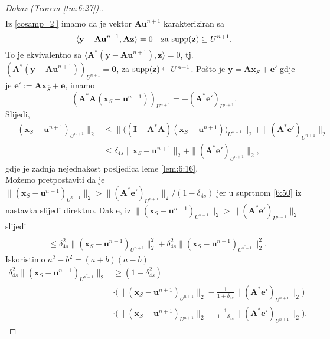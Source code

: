 \documentclass[a4paper,twoside,12pt]{memoir} %
\newcommand{\vect}[1]{\mathbf{#1}}
\renewcommand{\vec}{\vect}
\newcommand{\supp}{\text{\normalfont{supp}}}
\newcommand{\norm}[1]{\|{#1}\|}
\begin{document}
\begin{proof}[Dokaz (Teorem \ref{tm:6:27}).]
\begin{align}
    \end{align}
    Iz \eqref{cosamp_2'} imamo da je vektor $\vec {Au}^{n+1}$ karakteriziran sa
    \begin{equation*}
        \langle \vec y - \vec {Au}^{n+1}, \vec{Az}\rangle  = 0 \quad \text{za } \supp(\vec z) \subseteq U^{n+1}.
    \end{equation*}
    To je ekvivalentno sa $ \langle \vec A^*(\vec y - \vec{Au}^{n+1}), \vec z \rangle = 0$, tj. $(\vec A^*(\vec y - \vec{Au}^{n+1}))_{U^{n+1}} = \vec 0$, za $\supp(\vec z) \subseteq U^{n+1}$. Po\v{s}to je $\vec y = \vec{Ax}_S + \vec e'$ gdje je $\vec e' := \vec{Ax}_{\bar S} + \vec e$, imamo
    \begin{equation*}
        (\vec A^* \vec A(\vec x_S - \vec u^{n+1}))_{U^{n+1}} = - (\vec A^* \vec e')_{U^{n+1}}.
    \end{equation*}
    Slijedi,
    \begin{align*}
        \norm{(\vec x_S - \vec u^{n+1})_{U^{n+1}}}_2 &\leq \norm{\big( (\vec I - \vec A^* \vec A)(\vec x_S - \vec u^{n+1}) \big)_{U^{n+1}}}_2 + \norm{(\vec A^* \vec e')_{U^{n+1}}}_2 \\[0.5em]
        & \leq \delta_{4s}\norm{\vec x_S - \vec u^{n+1}}_2 + \norm{(\vec A^*\vec e')_{U^{n+1}}}_2,
    \end{align*}
    gdje je zadnja nejednakost posljedica leme \ref{lem:6:16}. \\
    Mo\v{z}emo pretpostaviti da je $\norm{(\vec x_S - \vec u^{n+1})_{U^{n+1}}}_2 > \norm{(\vec A^* \vec e')_{U^{n+1}}}_2/(1-\delta_{4s})$ jer u suprtnom \eqref{6:50} iz nastavka slijedi direktno. Dakle, iz $\norm{(\vec x_S - \vec u^{n+1})_{U^{n+1}}}_2 > \norm{(\vec A^* \vec e')_{U^{n+1}}}_2$ slijedi
    \begin{align*}
        [\norm{(\vec x_S - \vec u^{n+1}_{U^{n+1}})}_2 &- \norm{(\vec A^* \vec e')_{U^{n+1}}}_2] \\[0.5em]
        & \leq \delta_{4s}^2 \norm{(\vec x_S - \vec u^{n+1})_{U^{n+1}}}_2^2 + \delta_{4s}^2 \norm{(\vec x_S - \vec u^{n+1})_{\overline{U^{n+1}}}}_2^2.
    \end{align*}
    Iskoristimo $a^2 - b^2 = (a+b)(a-b)$
    \begin{align*}
        \delta_{4s}^2 \norm{(\vec x_S - \vec u^{n+1})_{\overline{U^{n+1}}}}_2 &\geq (1-\delta_{4s}^2)\\[0.5em]
        & \cdot \big( \norm{(\vec x_S - \vec u^{n+1})_{U^{n+1}}}_2 - \frac{1}{1+\delta_{4s}} \norm{(\vec A^* \vec e')_{U^{n+1}}}_2  \big)\\[0.5em]
        & \cdot \big( \norm{(\vec x_S - \vec u^{n+1})_{U^{n+1}}}_2 - \frac{1}{1-\delta_{4s}} \norm{(\vec A^* \vec e')_{U^{n+1}}}_2  \big).

\end{align*}
\end{proof}
\end{document}
